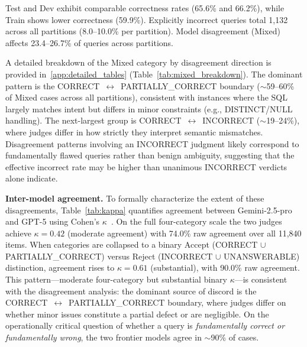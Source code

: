 \documentclass[print]{einformatica}
\begin{document}
Test and Dev exhibit comparable correctness rates (65.6\% and 66.2\%), while Train shows lower correctness (59.9\%). Explicitly incorrect queries total 1,132 across all partitions (8.0--10.0\% per partition). Model disagreement (Mixed) affects 23.4--26.7\% of queries across partitions.

A detailed breakdown of the Mixed category by disagreement direction is provided in~\ref{app:detailed_tables} (Table~\ref{tab:mixed_breakdown}). The dominant pattern is the CORRECT~$\leftrightarrow$~PARTIALLY\_CORRECT boundary ($\sim$59--60\% of Mixed cases across all partitions), consistent with instances where the SQL largely matches intent but differs in minor constraints (e.g., DISTINCT/NULL handling). The next-largest group is CORRECT~$\leftrightarrow$~INCORRECT ($\sim$19--24\%), where judges differ in how strictly they interpret semantic mismatches. Disagreement patterns involving an INCORRECT judgment likely correspond to fundamentally flawed queries rather than benign ambiguity, suggesting that the effective incorrect rate may be higher than unanimous INCORRECT verdicts alone indicate.

\textbf{Inter-model agreement.} To formally characterize the extent of these disagreements, Table~\ref{tab:kappa} quantifies agreement between Gemini-2.5-pro and GPT-5 using Cohen's $\kappa$~\cite{cohen1960coefficient}. On the full four-category scale the two judges achieve $\kappa = 0.42$ (moderate agreement) with 74.0\% raw agreement over all 11,840 items. When categories are collapsed to a binary Accept (CORRECT $\cup$ PARTIALLY\_CORRECT) versus Reject (INCORRECT $\cup$ UNANSWERABLE) distinction, agreement rises to $\kappa = 0.61$ (substantial), with 90.0\% raw agreement. This pattern---moderate four-category but substantial binary $\kappa$---is consistent with the disagreement analysis: the dominant source of discord is the CORRECT~$\leftrightarrow$~PARTIALLY\_CORRECT boundary, where judges differ on whether minor issues constitute a partial defect or are negligible. On the operationally critical question of whether a query is \emph{fundamentally correct or fundamentally wrong}, the two frontier models agree in $\sim$90\% of cases.
\end{document}
